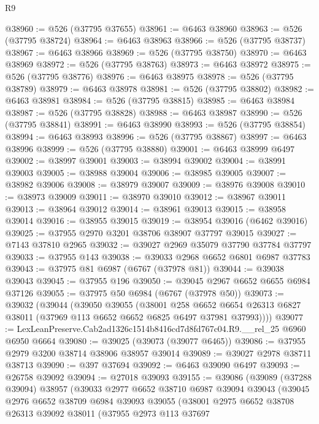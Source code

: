 \begin{lexlean}{R9}
\begin{coremodule}
@38960 := @526 (@37795 @37655)
@38961 := @6463 @38960
@38963 := @526 (@37795 @38724)
@38964 := @6463 @38963
@38966 := @526 (@37795 @38737)
@38967 := @6463 @38966
@38969 := @526 (@37795 @38750)
@38970 := @6463 @38969
@38972 := @526 (@37795 @38763)
@38973 := @6463 @38972
@38975 := @526 (@37795 @38776)
@38976 := @6463 @38975
@38978 := @526 (@37795 @38789)
@38979 := @6463 @38978
@38981 := @526 (@37795 @38802)
@38982 := @6463 @38981
@38984 := @526 (@37795 @38815)
@38985 := @6463 @38984
@38987 := @526 (@37795 @38828)
@38988 := @6463 @38987
@38990 := @526 (@37795 @38841)
@38991 := @6463 @38990
@38993 := @526 (@37795 @38854)
@38994 := @6463 @38993
@38996 := @526 (@37795 @38867)
@38997 := @6463 @38996
@38999 := @526 (@37795 @38880)
@39001 := @6463 @38999 @6497
@39002 := @38997 @39001
@39003 := @38994 @39002
@39004 := @38991 @39003
@39005 := @38988 @39004
@39006 := @38985 @39005
@39007 := @38982 @39006
@39008 := @38979 @39007
@39009 := @38976 @39008
@39010 := @38973 @39009
@39011 := @38970 @39010
@39012 := @38967 @39011
@39013 := @38964 @39012
@39014 := @38961 @39013
@39015 := @38958 @39014
@39016 := @38955 @39015
@39019 := @38954 @39016 (@6462 @39016)
@39025 := @37955 @2970 @3201 @38706 @38907 @37797 @39015
@39027 := @7143 @37810 @2965
@39032 := @39027 @2969 @35079 @37790 @37784 @37797
@39033 := @37955 @143
@39038 := @39033 @2968 @6652 @6801 @6987 @37783
@39043 := @37975 @81 @6987 (@6767 (@37978 @81))
@39044 := @39038 @39043
@39045 := @37955 @196
@39050 := @39045 @2967 @6652 @6655 @6984 @37126
@39055 := @37975 @50 @6984 (@6767 (@37978 @50))
@39073 := @39032
    (@39044
      (@39050
        @39055
        (@38001
          @258
          @6652
          @6654
          @26313
          @6827
          @38011
          (@37969 @113 @6652 @6652 @6825 @6497 @37981 @37993))))
@39077 := LexLeanPreserve.Cab2ad1326c1514b8416cd7d8fd767c04.R9.__rel_25 @6960 @6950 @6664
@39080 := @39025 (@39073 (@39077 @6465))
@39086 := @37955 @2979 @3200 @38714 @38906 @38957 @39014
@39089 := @39027 @2978 @38711 @38713
@39090 := @397 @37694
@39092 := @6463 @39090 @6497
@39093 := @26758 @39092
@39094 := @27018 @39093
@39155 := @39086
    (@39089
      (@37288 @39094)
      @38957
      (@39033
        @2977
        @6652
        @38710
        @6987
        @39094
        @39043
        (@39045
          @2976
          @6652
          @38709
          @6984
          @39093
          @39055
          (@38001
            @2975
            @6652
            @38708
            @26313
            @39092
            @38011
            (@37955
              @2973
              @113
              @37697

\end{coremodule}
\end{lexlean}
